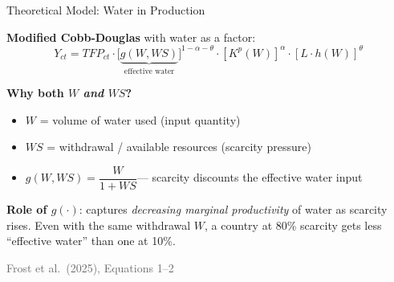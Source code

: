 \documentclass[aspectratio=169,12pt]{beamer}
\newcommand{\source}[1]{\vfill\hfill{\tiny\textcolor{dimgray}{#1}}}
\begin{document}
\begin{frame}{Theoretical Model: Water in Production}

\textbf{Modified Cobb-Douglas} with water as a factor:
\[
Y_{ct} = \mathit{TFP}_{ct} \cdot \bigl[\underbrace{g(W,WS)}_{\text{effective water}}\bigr]^{1-\alpha-\theta} \cdot [K^p(W)]^{\alpha} \cdot [L \cdot h(W)]^{\theta}
\]

\pause
\vspace{0.1cm}
\textbf{Why both $W$ \emph{and} $WS$?}
\begin{itemize}
    \item $W$ = volume of water used (input quantity)
    \item $WS$ = withdrawal / available resources (scarcity pressure)
    \item $g(W, WS) = \dfrac{W}{1 + WS}$\quad --- scarcity \alert{discounts} the effective water input
\end{itemize}

\pause
\vspace{0.2cm}
\textbf{Role of $g(\cdot)$}: captures \emph{decreasing marginal productivity} of water as scarcity rises. Even with the same withdrawal $W$, a country at 80\% scarcity gets less ``effective water'' than one at 10\%.

\source{Frost et al.\ (2025), Equations 1--2}
\end{frame}
\end{document}
